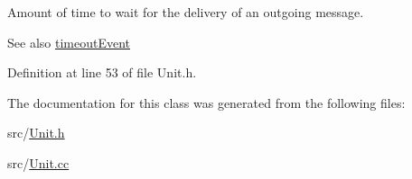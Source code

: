 Amount of time to wait for the delivery of an outgoing message. \begin{DoxySeeAlso}{See also}
\hyperlink{classsmart3p_1_1Unit_a48c180587dfed5ccd985f52f4fab6001}{timeout\+Event} 
\end{DoxySeeAlso}


Definition at line 53 of file Unit.\+h.



The documentation for this class was generated from the following files\+:\begin{DoxyCompactItemize}
\item 
src/\hyperlink{Unit_8h}{Unit.\+h}\item 
src/\hyperlink{Unit_8cc}{Unit.\+cc}\end{DoxyCompactItemize}
